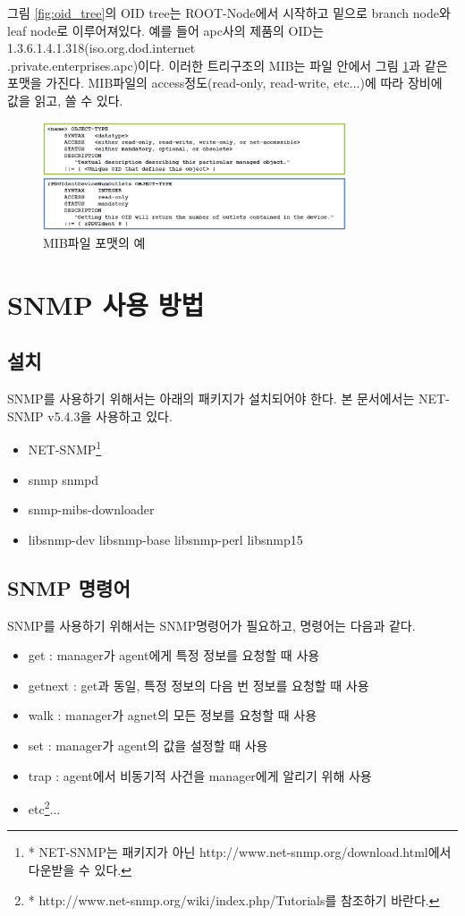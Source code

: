 \documentclass[11pt
  , a4paper
  , article
  , oneside
]{memoir}
\begin{document}
그림 \ref{fig:oid_tree}의 OID tree는 ROOT-Node에서 시작하고 밑으로 branch node와 leaf node로 이루어져있다. 예를 들어 apc사의 제품의 OID는 1.3.6.1.4.1.318(iso.org.dod.internet\\.private.enterprises.apc)이다. 이러한 트리구조의 MIB는 파일 안에서 그림 \ref{fig:ex_mib}과 같은 포맷을 가진다. MIB파일의 access정도(read-only, read-write, etc...)에 따라 장비에 값을 읽고, 쓸 수 있다.

\begin{figure}[h!]
  \centering
  \includegraphics[width=0.8\textwidth]{./images/ex_mib.eps}
  \caption{MIB파일 포맷의 예}
  \label{fig:ex_mib}   
\end{figure}

\chapter{SNMP 사용 방법}
\section{설치}
SNMP를 사용하기 위해서는 아래의 패키지가 설치되어야 한다. 본 문서에서는 NET-SNMP\citep{net_snmp} v5.4.3을 사용하고 있다.
\begin{itemize}
\item NET-SNMP\footnote{* NET-SNMP는 패키지가 아닌 http://www.net-snmp.org/download.html에서 다운받을 수 있다.}
\item snmp snmpd
\item snmp-mibs-downloader
\item libsnmp-dev libsnmp-base libsnmp-perl libsnmp15 
\end{itemize}


\section{SNMP 명령어}

SNMP를 사용하기 위해서는 SNMP명령어\citep{snmp_command}가 필요하고, 명령어는 다음과 같다.
\begin{itemize}
\item get : manager가 agent에게 특정 정보를 요청할 때 사용
\item getnext : get과 동일, 특정 정보의 다음 번 정보를 요청할 때 사용
\item walk : manager가 agnet의 모든 정보를 요청할 때 사용
\item set : manager가 agent의 값을 설정할 때 사용
\item trap : agent에서 비동기적 사건을 manager에게 알리기 위해 사용
\item etc\footnote{* http://www.net-snmp.org/wiki/index.php/Tutorials를 참조하기 바란다.}...
\end{itemize}
\end{document}
